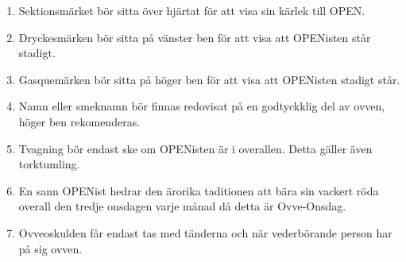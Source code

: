 \settowidth{\versewidth}{Bakom brödbutiken bodde Baskerbosses båda bröder,}



\begin{enumerate}[leftmargin=1cm,labelindent=16pt,label=\bfseries \arabic*.]
\item Sektionsmärket bör sitta över hjärtat för att visa sin kärlek till OPEN.
\item Dryckesmärken bör sitta på vänster ben för att visa att OPENisten står stadigt.
\item Gasquemärken bör sitta på höger ben för att visa att OPENisten stadigt står.
\item Namn eller smeknamn bör finnas redovisat på en godtyckklig del av ovven, höger ben rekomenderas.
\item Tvagning bör endast ske om OPENisten är i overallen. 
Detta gäller även torktumling.
\item En sann OPENist hedrar den ärorika taditionen att bära sin vackert röda overall den tredje onsdagen varje månad då detta är Ovve-Onsdag.
\item Ovveoskulden får endast tas med tänderna och när vederbörande person har på sig ovven.
\end{enumerate}

